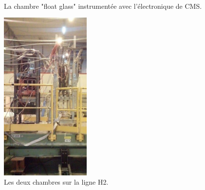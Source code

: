 \begin{figure}[ht]
	 \hfill
	{\,}
	\caption{La chambre "float glass" instrumentée avec l'électronique de CMS.}
	\label{chambrefloat}
\end{figure}

\newpage
\begin{figure}
	\centering
	\includegraphics[width=0.40\textwidth]{GLA/GCH2.png}
	\caption{Les deux chambres sur la ligne H2.}
	\label{GCH2}
\end{figure}


